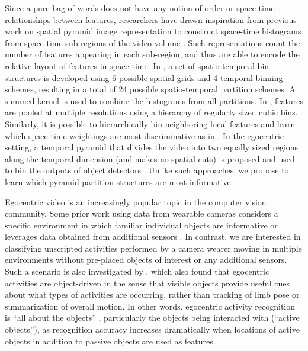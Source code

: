 \documentclass[12pt]{article} %
\begin{document}
  Since a pure bag-of-words does not have any notion of order or space-time
  relationships between features, researchers have drawn inspiration from 
  previous work on spatial pyramid image representation \cite{Bosch07, Lazebnik06} 
  to construct space-time histograms from space-time sub-regions of the video
  volume \cite{Laptev08, Ramanan12}. Such representations count the number of
  features appearing in each sub-region, and thus are able to encode the relative
  layout of features in space-time.
  In \cite{Laptev08}, a set of spatio-temporal bin structures is developed using 
  6 possible spatial grids and 4 temporal binning
  schemes, resulting in a total of 24 possible spatio-temporal partition
  schemes. A summed kernel is used to combine the histograms from all partitions.
  In \cite{Choi08}, features are pooled at multiple resolutions using a hierarchy
  of regularly sized cubic bins. Similarly, it is possible to hierarchically bin
  neighboring local features and learn which space-time weightings are most
  discriminative as in \cite{Kovashka10}. In the egocentric setting, a temporal
  pyramid that divides the video into two equally sized regions along the
  temporal dimension (and makes no spatial cuts) is proposed and used to bin the
  outputs of object detectors \cite{Ramanan12}. Unlike such approaches, we
  propose to learn which pyramid partition structures are most informative. 




  Egocentric video is an increasingly popular topic in the computer vision
  community. Some prior work using data from wearable cameras considers a
  specific environment in which familiar individual objects are informative
  \cite{Fathi-ICCV2011, Hanheide, Sundaram} or leverages data obtained from
  additional sensors \cite{Spriggs}. In contrast, we are interested in
  classifying unscripted activities performed by a camera wearer moving in
  multiple environments without pre-placed objects of interest or any additional
  sensors. Such a scenario is also investigated by \cite{Ramanan12}, which also
  found that
  egocentric activities are object-driven
  in the sense that visible objects provide useful cues about what types of
  activities are occurring, rather than tracking of limb pose or
  summarization of overall motion. In other words,
	egocentric activity recognition is ``all about
  the objects'' \cite{Ramanan12}, particularly the objects being interacted
  with (``active objects''), as
	recognition accuracy increases dramatically when locations of active
  objects in addition to passive objects are used as features. 
  
\end{document}
